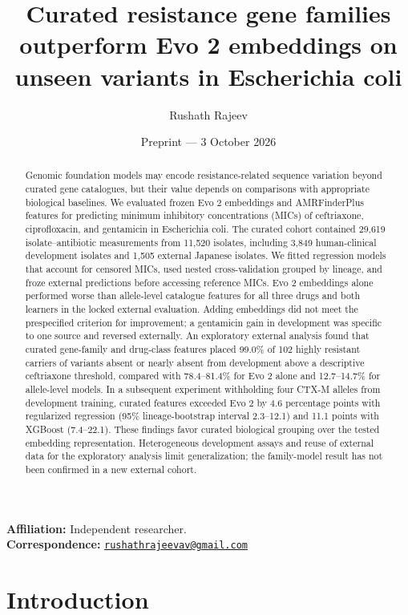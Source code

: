 \documentclass[
  american,
  11pt,
]{article}
\title{Curated resistance gene families outperform Evo 2 embeddings on
unseen variants in Escherichia coli}
\author{Rushath Rajeev}
\date{Preprint --- 3 October 2026}
\begin{document}
\maketitle
\begin{abstract}
Genomic foundation models may encode resistance-related sequence
variation beyond curated gene catalogues, but their value depends on
comparisons with appropriate biological baselines. We evaluated frozen
Evo 2 embeddings and AMRFinderPlus features for predicting minimum
inhibitory concentrations (MICs) of ceftriaxone, ciprofloxacin, and
gentamicin in Escherichia coli. The curated cohort contained 29,619
isolate--antibiotic measurements from 11,520 isolates, including 3,849
human-clinical development isolates and 1,505 external Japanese
isolates. We fitted regression models that account for censored MICs,
used nested cross-validation grouped by lineage, and froze external
predictions before accessing reference MICs. Evo 2 embeddings alone
performed worse than allele-level catalogue features for all three drugs
and both learners in the locked external evaluation. Adding embeddings
did not meet the prespecified criterion for improvement; a gentamicin
gain in development was specific to one source and reversed externally.
An exploratory external analysis found that curated gene-family and
drug-class features placed 99.0\% of 102 highly resistant carriers of
variants absent or nearly absent from development above a descriptive
ceftriaxone threshold, compared with 78.4--81.4\% for Evo 2 alone and
12.7--14.7\% for allele-level models. In a subsequent experiment
withholding four CTX-M alleles from development training, curated
features exceeded Evo 2 by 4.6 percentage points with regularized
regression (95\% lineage-bootstrap interval 2.3--12.1) and 11.1 points
with XGBoost (7.4--22.1). These findings favor curated biological
grouping over the tested embedding representation. Heterogeneous
development assays and reuse of external data for the exploratory
analysis limit generalization; the family-model result has not been
confirmed in a new external cohort.
\end{abstract}

\textbf{Affiliation:} Independent researcher.\\
\textbf{Correspondence:}
\href{mailto:rushathrajeevav@gmail.com}{\nolinkurl{rushathrajeevav@gmail.com}}

\section{Introduction}\label{introduction}
\end{document}
